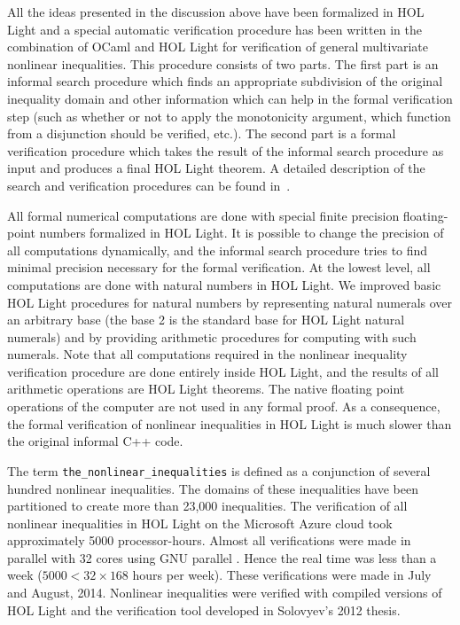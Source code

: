 All the ideas presented in the discussion above have been
formalized in HOL Light and a special automatic verification procedure
has been written in the combination of OCaml and HOL Light for
verification of general multivariate nonlinear inequalities. This
procedure consists of two parts. The first part is an informal search
procedure which finds an appropriate subdivision of the original
inequality domain and other information which can help in the formal
verification step (such as whether or not to apply the monotonicity
argument, which function from a disjunction should be verified,
etc.). The second part is a formal verification procedure which takes
the result of the informal search procedure as input and produces a
final HOL Light theorem. A detailed description of the search and
verification procedures can be found
in~\cite{Solovyev-thesis,Solovyev:NFM2013}.

All formal numerical computations are done with special finite
precision floating-point numbers formalized in HOL Light. It is
possible to change the precision of all computations dynamically, and
the informal search procedure tries to find minimal precision
necessary for the formal verification. At the lowest level, all
computations are done with natural numbers in HOL Light. We improved
basic HOL Light procedures for natural numbers by representing natural
numerals over an arbitrary base (the base 2 is the standard base for
HOL Light natural numerals) and by providing arithmetic procedures for
computing with such numerals. Note that all computations required in
the nonlinear inequality verification procedure are done entirely
inside HOL Light, and the results of all arithmetic operations are HOL
Light theorems.  The native floating point operations of the computer
are not used in any formal proof.  As a consequence, the formal
verification of nonlinear inequalities in HOL Light is much slower
than the original informal C++ code.

The term \verb!the_nonlinear_inequalities! is defined as a conjunction
of several hundred nonlinear inequalities. The domains of these
inequalities have been partitioned to create more than 23,000
inequalities. The verification of all nonlinear inequalities in HOL
Light on the Microsoft Azure cloud took approximately 5000
processor-hours. Almost all verifications were made in parallel with
32 cores using GNU parallel \cite{Tange2011a}.  Hence the real time
was less than a week ($5000 < 32\times 168$ hours per week). These
verifications were made in July and August, 2014.  Nonlinear
inequalities were verified with compiled versions of HOL Light and the
verification tool developed in Solovyev's 2012 thesis.

